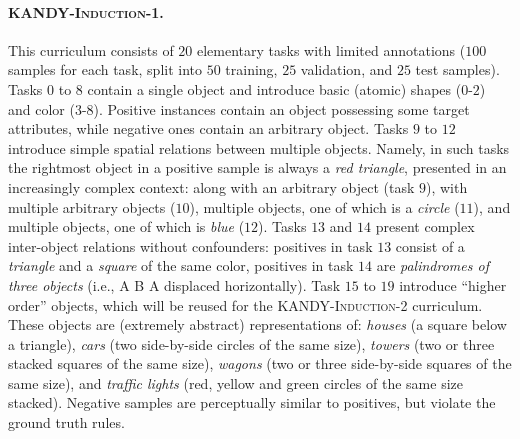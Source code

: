\paragraph{\textsc{KANDY-Induction-1}.} This curriculum consists of $20$ elementary tasks with limited annotations ($100$ samples for each task, split into $50$ training, $25$ validation, and $25$ test samples).
Tasks $0$ to $8$ contain a single object and introduce basic (atomic) shapes ($0$-$2$) and color ($3$-$8$). %
Positive instances contain an object possessing some target attributes, while negative ones contain an arbitrary object.
%
Tasks $9$ to $12$ introduce simple spatial relations between multiple objects. Namely, in such tasks the rightmost object in a positive sample is always a {\it red triangle}, presented in an increasingly complex context: along with an arbitrary object (task $9$), with multiple arbitrary objects ($10$), multiple objects, one of which is a {\it circle} ($11$), and multiple objects, one of which is {\it blue} ($12$). %
%
Tasks $13$ and $14$ present complex inter-object relations without confounders: positives in task $13$ consist of a {\it triangle} and a {\it square} of the same color, positives in task $14$ are {\it palindromes of three objects} (i.e., A B A displaced horizontally).
%
Task $15$ to $19$ introduce ``higher order'' objects, which will be reused for the \textsc{KANDY-Induction-2} curriculum. These objects are (extremely abstract) representations of: {\it houses} (a square below a triangle), {\it cars} (two side-by-side circles of the same size), {\it towers} (two or three stacked squares of the same size), {\it wagons} (two or three side-by-side squares of the same size), and {\it traffic lights} (red, yellow and green circles of the same size stacked). Negative samples are perceptually similar to positives, but violate the ground truth rules. %


